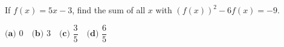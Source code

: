 If $f(x)=5x-3$, find the sum of all $x$ with $(f(x))^2-6f(x)=-9$.

$\textbf{(a) }0\quad\textbf{(b) }3\quad\textbf{(c) }\dfrac35\quad\textbf{(d) }\dfrac65$
